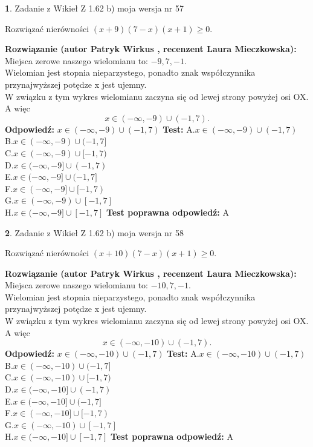 \documentclass[12pt, a4paper]{article}
\theoremstyle{definition} %
\newtheorem{zad}{}
\newcommand{\zadStart}[1]{\begin{zad}#1\newline}
\newcommand{\zadStop}{\end{zad}}
\newcommand{\rozwStart}[2]{\noindent \textbf{Rozwiązanie (autor #1 , recenzent #2): }\newline}
\newcommand{\rozwStop}{\newline}
\newcommand{\odpStart}{\noindent \textbf{Odpowiedź:}\newline}
\newcommand{\odpStop}{\newline}
\newcommand{\testStart}{\noindent \textbf{Test:}\newline}
\newcommand{\testStop}{\newline}
\newcommand{\kluczStart}{\noindent \textbf{Test poprawna odpowiedź:}\newline}
\newcommand{\kluczStop}{\newline}
\begin{document}
\zadStart{Zadanie z Wikieł Z 1.62 b) moja wersja nr 57}

Rozwiązać nierówności $(x+9)(7-x)(x+1)\ge0$.
\zadStop
\rozwStart{Patryk Wirkus}{Laura Mieczkowska}
Miejsca zerowe naszego wielomianu to: $-9, 7, -1$.\\
Wielomian jest stopnia nieparzystego, ponadto znak współczynnika przy\linebreak najwyższej potędze x jest ujemny.\\ W związku z tym wykres wielomianu zaczyna się od lewej strony powyżej osi OX. A więc $$x \in (-\infty,-9) \cup (-1,7).$$
\rozwStop
\odpStart
$x \in (-\infty,-9) \cup (-1,7)$
\odpStop
\testStart
A.$x \in (-\infty,-9) \cup (-1,7)$\\
B.$x \in (-\infty,-9) \cup (-1,7]$\\
C.$x \in (-\infty,-9) \cup [-1,7)$\\
D.$x \in (-\infty,-9] \cup (-1,7)$\\
E.$x \in (-\infty,-9] \cup (-1,7]$\\
F.$x \in (-\infty,-9] \cup [-1,7)$\\
G.$x \in (-\infty,-9) \cup [-1,7]$\\
H.$x \in (-\infty,-9] \cup [-1,7]$
\testStop
\kluczStart
A
\kluczStop



\zadStart{Zadanie z Wikieł Z 1.62 b) moja wersja nr 58}

Rozwiązać nierówności $(x+10)(7-x)(x+1)\ge0$.
\zadStop
\rozwStart{Patryk Wirkus}{Laura Mieczkowska}
Miejsca zerowe naszego wielomianu to: $-10, 7, -1$.\\
Wielomian jest stopnia nieparzystego, ponadto znak współczynnika przy\linebreak najwyższej potędze x jest ujemny.\\ W związku z tym wykres wielomianu zaczyna się od lewej strony powyżej osi OX. A więc $$x \in (-\infty,-10) \cup (-1,7).$$
\rozwStop
\odpStart
$x \in (-\infty,-10) \cup (-1,7)$
\odpStop
\testStart
A.$x \in (-\infty,-10) \cup (-1,7)$\\
B.$x \in (-\infty,-10) \cup (-1,7]$\\
C.$x \in (-\infty,-10) \cup [-1,7)$\\
D.$x \in (-\infty,-10] \cup (-1,7)$\\
E.$x \in (-\infty,-10] \cup (-1,7]$\\
F.$x \in (-\infty,-10] \cup [-1,7)$\\
G.$x \in (-\infty,-10) \cup [-1,7]$\\
H.$x \in (-\infty,-10] \cup [-1,7]$
\testStop
\kluczStart
A
\kluczStop
\end{document}
